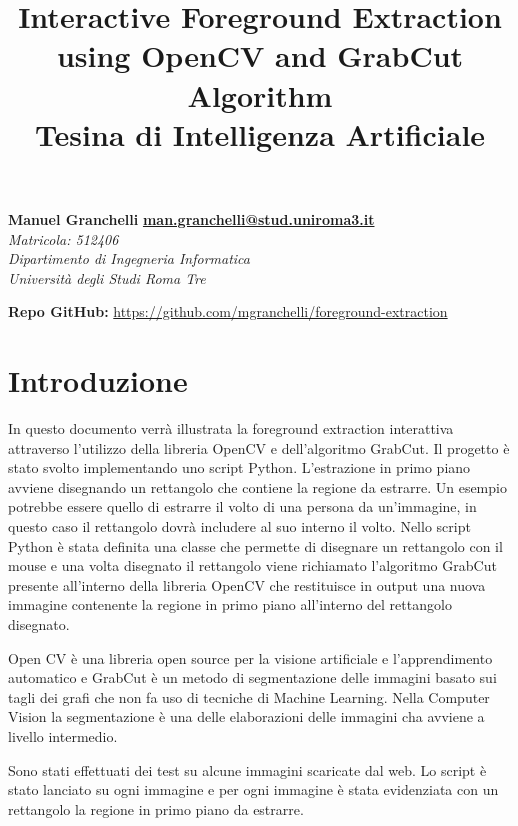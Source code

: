 \documentclass{article}
\title{
  Interactive Foreground Extraction using OpenCV and GrabCut Algorithm \\
  \large Tesina di Intelligenza Artificiale}
\date{}
\begin{document}
\maketitle

\begin{flushleft}
\textbf{Manuel Granchelli} 
\hfill {\href{mailto:man.granchelli@stud.uniroma3.it}{\textbf{man.granchelli@stud.uniroma3.it}}} \\
\textit{Matricola: 512406}\\
\textit{Dipartimento di Ingegneria Informatica}\\
\textit{Università degli Studi Roma Tre}\\
\par\bigskip
\textbf{Repo GitHub:} \href{https://github.com/mgranchelli/foreground-extraction}{https://github.com/mgranchelli/foreground-extraction}
\end{flushleft}

\section*{Introduzione}
In questo documento verrà illustrata la foreground extraction interattiva attraverso l'utilizzo della libreria OpenCV e dell'algoritmo GrabCut. Il progetto è stato svolto implementando uno script Python. L'estrazione in primo piano avviene disegnando un rettangolo che contiene la regione da estrarre. Un esempio potrebbe essere quello di estrarre il volto di una persona da un'immagine, in questo caso il rettangolo dovrà includere al suo interno il volto. Nello script Python è stata definita una classe che permette di disegnare un rettangolo con il mouse e una volta disegnato il rettangolo viene richiamato l'algoritmo GrabCut presente all'interno della libreria OpenCV che restituisce in output una nuova immagine contenente la regione in primo piano all'interno del rettangolo disegnato. 

Open CV è una libreria open source per la visione artificiale e l'apprendimento automatico e GrabCut è un metodo di segmentazione delle immagini basato sui tagli dei grafi che non fa uso di tecniche di Machine Learning. Nella Computer Vision la segmentazione è una delle elaborazioni delle immagini cha avviene a livello intermedio.

Sono stati effettuati dei test su alcune immagini scaricate dal web. Lo script è stato lanciato su ogni immagine e per ogni immagine è stata evidenziata con un rettangolo la regione in primo piano da estrarre. 
\end{document}
